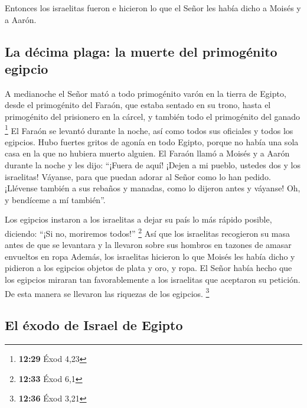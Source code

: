  Entonces los israelitas fueron e hicieron lo que el
Señor les había dicho a Moisés y a Aarón.

\hypertarget{la-duxe9cima-plaga-la-muerte-del-primoguxe9nito-egipcio}{%
\subsection{La décima plaga: la muerte del primogénito
egipcio}\label{la-duxe9cima-plaga-la-muerte-del-primoguxe9nito-egipcio}}

 A medianoche el Señor mató a todo primogénito varón en
la tierra de Egipto, desde el primogénito del Faraón, que estaba sentado
en su trono, hasta el primogénito del prisionero en la cárcel, y también
todo el primogénito del ganado \footnote{\textbf{12:29} Éxod 4,23}
 El Faraón se levantó durante la noche, así como todos
sus oficiales y todos los egipcios. Hubo fuertes gritos de agonía en
todo Egipto, porque no había una sola casa en la que no hubiera muerto
alguien.  El Faraón llamó a Moisés y a Aarón durante la
noche y les dijo: ``¡Fuera de aquí! ¡Dejen a mi pueblo, ustedes dos y
los israelitas! Váyanse, para que puedan adorar al Señor como lo han
pedido.  ¡Llévense también a sus rebaños y manadas, como
lo dijeron antes y váyanse! Oh, y bendíceme a mí también''.

 Los egipcios instaron a los israelitas a dejar su país
lo más rápido posible, diciendo: ``¡Si no, moriremos todos!''
\footnote{\textbf{12:33} Éxod 6,1}  Así que los
israelitas recogieron su masa antes de que se levantara y la llevaron
sobre sus hombros en tazones de amasar envueltos en ropa 
Además, los israelitas hicieron lo que Moisés les había dicho y pidieron
a los egipcios objetos de plata y oro, y ropa.  El Señor
había hecho que los egipcios miraran tan favorablemente a los israelitas
que aceptaron su petición. De esta manera se llevaron las riquezas de
los egipcios. \footnote{\textbf{12:36} Éxod 3,21}

\hypertarget{el-uxe9xodo-de-israel-de-egipto}{%
\subsection{El éxodo de Israel de
Egipto}\label{el-uxe9xodo-de-israel-de-egipto}}

